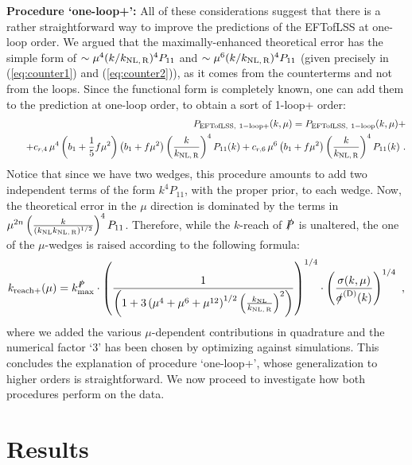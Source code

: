 \documentclass[12pt,a4paper]{article}
\def\nn{\nonumber}
\def\PA{\slashed{P}}
\renewcommand{\(}{\left(}
\renewcommand{\)}{\right)}
\def\be{\begin{equation}}
\def\ee{\end{equation}}
\def\ba{\begin{eqnarray}}
\def\ea{\end{eqnarray}}
\def\knl{{k_{\rm NL}}}
\def\knlr{{k_{\rm NL,\,R}}}
\begin{document}
{\bf Procedure `one-loop+':} All of these considerations suggest that there is a rather straightforward way to improve the predictions of the EFTofLSS at one-loop order. We argued that the maximally-enhanced theoretical error has the simple form of $\sim \mu^4 (k/\knlr)^4P_{11}$ and $\sim\mu^6 (k/\knlr)^4P_{11}$ (given precisely in (\ref{eq:counter1}) and (\ref{eq:counter2})), as it comes from the counterterms and not from the loops. Since the functional form is completely known, one can add them to the prediction at one-loop order, to obtain a sort of 1-loop+ order:
\ba
&&P_{\rm EFTofLSS,\ 1-loop+}(k,\mu)=P_{\rm EFTofLSS,\ 1-loop}(k,\mu)+\\ \nn
&&\quad+c_{r,4}\,\mu^4 \left(b_1+\frac{1}{5}f\mu^2\right) \left(b_1+f\mu^2\right)  \left(\frac{k}{\knlr}\right)^4P_{11}(k)%
+c_{r,6} \,\mu^6 \left(b_1+f\mu^2\right)  \left(\frac{k}{\knlr}\right)^4P_{11}(k)\ .
\ea
Notice that since we have two wedges, this {procedure amounts} to add two independent terms of the form $k^4 P_{11}$, with the proper prior, to each wedge.
Now, the theoretical error in the $\mu$ direction is dominated by the terms in $\mu^{2 n} \left(\frac{k}{(\knl\knlr)^{1/2}}\right)^4 P_{11}$. Therefore, while the $k$-reach of $\PA$ is unaltered, the one of the $\mu$-wedges is raised according to the following formula: 
\be\label{eq:kreachbins2}
k_{\rm reach+}(\mu)=k_{\rm max}^\slashed{P}\cdot\left(\frac{1}{\left(1+3\left(\mu^4+\mu^6+\mu^{12}\right)^{1/2}\left(\frac{\knl}{\knlr}\right)^2\right)}\right)^{1/4} \cdot\left(\frac{\sigma(k,\mu)}{\slashed{\sigma}^{\rm (D)}(k)}\right)^{1/4}\ ,
\ee
where we added the various $\mu$-dependent contributions in quadrature and the numerical factor `3' has been chosen by optimizing against simulations. This concludes the explanation of procedure `one-loop+', whose generalization to higher orders is straightforward. We now proceed to investigate how both procedures perform on the data.









\section{Results}
\end{document}
